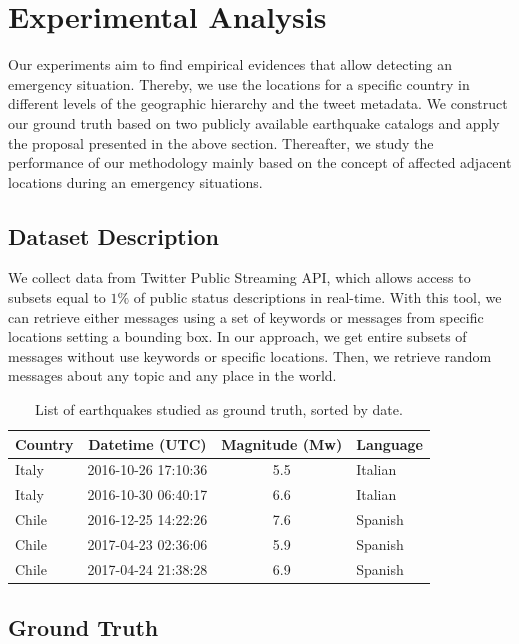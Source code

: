 \documentclass[sigconf]{acmart}
\begin{document}
\section{Experimental Analysis}

Our experiments aim to find empirical evidences that allow detecting an emergency situation. Thereby, we use the locations for a specific country in different levels of the geographic hierarchy and the tweet metadata. We construct our ground truth based on two publicly available earthquake catalogs and apply the proposal presented in the above section. Thereafter, we study the performance of our methodology mainly based on the concept of affected adjacent locations during an emergency situations.

\subsection{Dataset Description}

We collect data from Twitter Public Streaming API, which allows access to subsets equal to $1\%$ of public status descriptions in real-time. With this tool, we can retrieve either messages using a set of keywords or messages from specific locations setting a bounding box. In our approach, we get entire subsets of messages without use keywords or specific locations. Then, we retrieve random messages about any topic and any place in the world.
 
 \begin{table}
 	\caption{List of earthquakes studied as ground truth, sorted by date.}
 	\label{tab:eqs}
 	\begin{tabular}{lccl}
 		\toprule
 		Country&Datetime (UTC)&Magnitude (Mw)& Language\\
 		\midrule
 		Italy & 2016-10-26 17:10:36 & 5.5 & Italian \\
 		Italy & 2016-10-30 06:40:17 & 6.6 & Italian\\
 		Chile & 2016-12-25 14:22:26 & 7.6 & Spanish\\
 		Chile & 2017-04-23 02:36:06 & 5.9 & Spanish\\
 		Chile & 2017-04-24 21:38:28 & 6.9 & Spanish\\
 		\midrule
 	\end{tabular}
 \end{table}
 
 
\subsection{Ground Truth}
\end{document}
